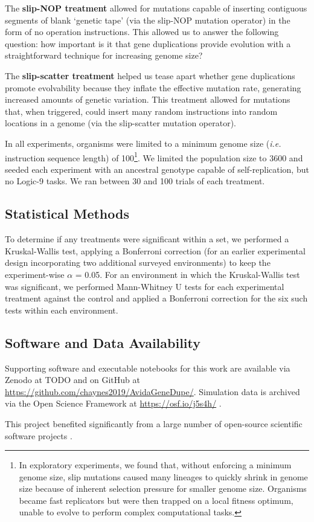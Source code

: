 The \textbf{slip-NOP treatment} allowed for mutations capable of inserting contiguous segments of blank `genetic tape' (via the slip-NOP mutation operator) in the form of no operation instructions. This allowed us to answer the following question: how important is it that gene duplications provide evolution with a straightforward technique for increasing genome size?

The \textbf{slip-scatter treatment} helped us tease apart whether gene duplications promote evolvability because they inflate the effective mutation rate, generating increased amounts of genetic variation. This treatment allowed for mutations that, when triggered, could insert many random instructions into random locations in a genome (via the slip-scatter mutation operator).

In all experiments, organisms were limited to a minimum genome size (\textit{i.e.} instruction sequence length) of 100\footnote{
In exploratory experiments, we found that, without enforcing a minimum genome size, slip mutations caused many lineages to quickly shrink in genome size because of inherent selection pressure for smaller genome size. Organisms became fast replicators but were then trapped on a local fitness optimum, unable to evolve to perform complex computational tasks.
}.
We limited the population size to 3600 and seeded each experiment with an ancestral genotype capable of self-replication, but no Logic-9 tasks.
We ran between 30 and 100 trials of each treatment.

\subsection{Statistical Methods}

To determine if any treatments were significant within a set, we performed a Kruskal-Wallis test, applying a Bonferroni correction (for an earlier experimental design incorporating two additional surveyed environments) to keep the experiment-wise $\alpha$ = 0.05.
For an environment in which the Kruskal-Wallis test was significant, we performed Mann-Whitney U tests for each experimental treatment against the control and applied a Bonferroni correction for the six such tests within each environment.

\subsection{Software and Data Availability} \label{sec:materials}

Supporting software and executable notebooks for this work are available via Zenodo at TODO \citep{TODO} and on GitHub at \url{https://github.com/chaynes2019/AvidaGeneDupe/}.
Simulation data is archived via the Open Science Framework at \url{https://osf.io/j5s4h/} \citep{foster2017open}.

This project benefited significantly from a large number of open-source scientific software projects \citep{2020SciPy-NMeth,harris2020array,reback2020pandas,mckinney-proc-scipy-2010,waskom2021seaborn,hunter2007matplotlib,moreno2023teeplot,r_core_team_r:_2015}.
